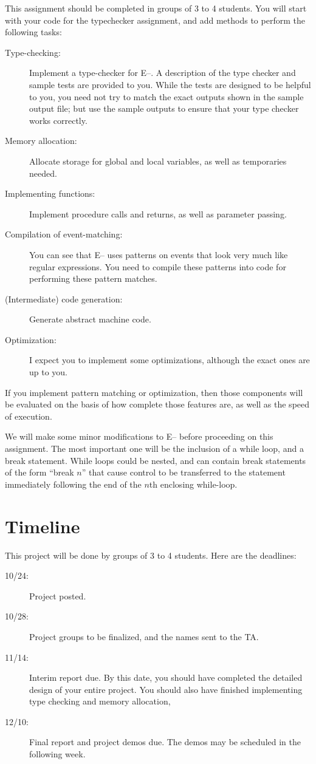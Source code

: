 \documentclass{article}
\begin{document}
This assignment should be completed in groups of 3 to 4 students.
You will start with your code for the typechecker assignment, and
add methods to perform the following tasks:
\begin{description}
\item[Type-checking:] Implement a type-checker for E--. A description of
  the type checker and sample tests are provided to you. While the tests are
  designed to be helpful to you, you need not try to match the exact outputs
  shown in the sample output file; but use the sample outputs to ensure
  that your type checker works correctly.
\item[Memory allocation:] Allocate storage for global and local variables,
   as well as temporaries needed. 
\item[Implementing functions:] Implement procedure calls and returns,
as well as parameter passing.
\item[Compilation of event-matching:] You can see that E-- uses patterns
on events that look very much like regular expressions. You need to 
compile these patterns into code for performing these pattern matches.
\item[(Intermediate) code generation:] Generate abstract machine code. 
\item[Optimization:] I expect you to implement some optimizations, although
the exact ones are up to you. 
\end{description}
%
If you implement pattern matching or optimization, then those components
will be evaluated on the basis of how complete those features are, as
well as the speed of execution.

We will make some minor modifications to E-- before proceeding on this
assignment. The most important one will be the inclusion of a while loop,
and a break statement. While loops could be nested, and can contain
break statements of the form ``break $n$'' that cause control to be
transferred to the statement immediately following the end of the
$n$th enclosing while-loop. 

\section{Timeline}
%
This project will be done by groups of 3 to 4 students. Here are the
deadlines:
\begin{description}
\item[10/24:] Project posted.
\item[10/28:] Project groups to be finalized, and the names sent to the TA.
\item[11/14:] Interim report due. By this date, you should have completed
  the detailed design of your entire project. You should also have finished
  implementing type checking and memory allocation,
\item[12/10:] Final report and project demos due. The demos may be scheduled in
  the following week.
\end{description}
\end{document}
